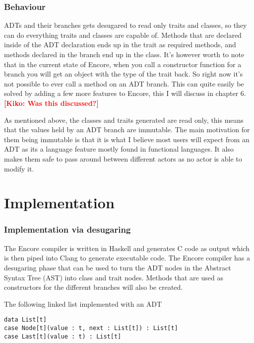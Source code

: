 \documentclass[10pt]{report}
\newcommand{\KIKO}[1]{\textcolor{red}{\textbf{[Kiko: #1]}}}
\begin{document}
\subsection{Behaviour}
\par{ADTs and their branches gets desugared to read only traits and classes, so they can do everything traits and classes are capable of.  Methods that are declared inside of the ADT declaration ends up in the trait as required methods, and methods declared in the branch end up in the class. It's however worth to note that in the current state of Encore, when you call a constructor function for a branch you will get an object with the type of the trait back. So right now it's not possible to ever call a method on an ADT branch. This can quite easily be solved by adding a few more features to Encore, this I will discuss in chapter 6. \KIKO{Was this discussed?}}
\par{As mentioned above, the classes and traits generated are read only, this means that the values held by an ADT branch are immutable.  The main motivation for them being immutable is that it is what I believe most users will expect from an ADT as its a language feature mostly found in functional languages. It also makes them safe to pass around between different actors as no actor is able to modify it.}
\chapter{Implementation}

\subsection{Implementation via desugaring}
\par{The Encore compiler is written in Haskell and generates C code as output which is then piped into Clang to generate executable code. The Encore compiler has a desugaring phase that can be used to turn the ADT nodes in the Abstract Syntax Tree (AST) into class and trait nodes. Methods that are used as constructors for the different branches will also be created.}
\par{The following linked list implemented with an ADT}

\begin{lstlisting}[language=encore,caption={Linked list before it has been desugared}]
data List[t]
case Node[t](value : t, next : List[t]) : List[t]
case Last[t](value : t) : List[t]
\end{lstlisting}
\end{document}

